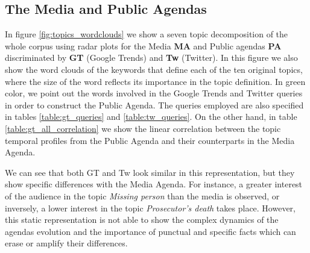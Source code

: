 \documentclass{bmcart}
\begin{document}
\subsection*{The Media and Public Agendas}

\par In figure \ref{fig:topics_wordclouds} we show a seven topic decomposition of the whole corpus using radar plots for the Media \textbf{MA} and Public agendas \textbf{PA} discriminated by \textbf{GT} (Google Trends) and \textbf{Tw} (Twitter). In this figure we also show the word clouds of the keywords that define each of the ten original topics, where the size of the word reflects its importance in the topic definition. In green color, we point out the words involved in the Google Trends and Twitter queries in order to construct the Public Agenda. The queries employed are also specified in tables \ref{table:gt_queries} and \ref{table:tw_queries}. 
On the other hand, in table \ref{table:gt_all_correlation} we show the linear correlation between the topic temporal profiles from the Public Agenda and their counterparts in the Media Agenda.
\par We can see that both GT and Tw look similar in this representation, but they show specific differences with the Media Agenda. For instance, a greater interest of the audience in the topic \emph{Missing person} than the media is observed, or inversely, a lower interest in the topic \emph{Prosecutor's death} takes place. However, this static representation is not able to show the complex dynamics of the agendas evolution and the importance of punctual and specific facts which can erase or amplify their differences. 
\end{document}
